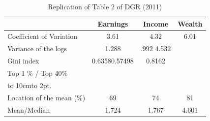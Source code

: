 \documentclass[12pt]{article}%
\def\dotfill#1{\cleaders\hbox to #1{.}\hfill}
\newcommand\dotline[2][.5em]{\leavevmode\hbox to #2{\dotfill{#1}\hfil}}
\begin{document}
\begin{enumerate}
	\begin {table}[H]
\footnotesize
\begin{center}
	\caption {Replication of Table 2 of DGR (2011)}
	\label{tab:Table2}
	{
		\begin{tabular}{l*{3}{c}}
			\hline
			&  Earnings&Income&Wealth\\
			\hline
			Coefficient of Variation &  3.61 &   4.32 &  6.01\\
			Variance of the logs  &1.288 & .992 4.532	 \\
			Gini index & 0.63580.57498&0.8162\\
			Top 1 \% /  Top 40\%&&&\\
			\multicolumn{4}{l}{\dotline[2pt]{10cm}} \\
			Location of the mean (\%) &69&74&81\\
			Mean/Median & 1.724 &	1.767 & 4.601\\
			\hline
		\end{tabular}
	}	
	
\end{center} 
\end {table}
	
	\vspace{3mm}
	

\end{enumerate}
\end{document}
